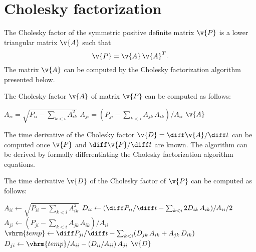 
\section{Cholesky factorization} \label{app:chol}

The Cholesky factor of the symmetric positive definite matrix $\v{P}$ is
a lower triangular matrix $\v{A}$ such that
%
\begin{equation}
  \v{P} = \v{A} \, \v{A}^T.
\end{equation}
%
The matrix $\v{A}$ can be computed by the Cholesky factorization
algorithm \citep[see, e.g., ][]{Golub+vanLoan:1996} presented below.

The Cholesky factor
  $\v{A}$ of matrix $\v{P}$ can be computed as follows:
\begin{algorithmic}[1]
     \State $A_{ii} = \sqrt{P_{ii} - \sum_{k<i} A^2_{ik}}$
        \State $A_{ji} = \left(P_{ji} - \sum_{k<i} A_{jk} \, A_{ik} \right) / A_{ii}$
     \EndFor
  \EndFor
  \State \Return $\v{A}$
\EndProcedure
\end{algorithmic}
%
The time derivative of the Cholesky factor $\v{D} = \diff \v{A} /
\diff t$ can be computed once $\v{P}$ and $\diff \v{P} / \diff t$
are known. The algorithm can be derived by formally differentiating
the Cholesky factorization algorithm equations.

The time
 derivative $\v{D}$ of the Cholesky factor of $\v{P}$ can be
 computed as follows:
\label{alg:dchol}
\begin{algorithmic}[1]
    \State $A_{ii} \gets \sqrt{P_{ii} - \sum_{k<i} A^2_{ik}}$
    \State $D_{ii} \gets (\diff P_{ii} / \diff t -
                     \sum_{k<i} 2 D_{ik} \, A_{ik}) / A_{ii} / 2$
       \State $A_{ji} \gets (P_{ji} - \sum_{k<i} A_{jk} \, A_{ik}) / A_{ii}$
       \State $\vhrm{temp} \gets \diff P_{ji} / \diff t
              - \sum_{k<i} (D_{jk} \, A_{ik} + A_{jk} \, D_{ik})$
       \State $D_{ji} \gets \vhrm{temp} / A_{ii} - (D_{ii} / A_{ii}) \, A_{ji}$
    \EndFor
 \EndFor
 \State \Return $\v{D}$
\EndProcedure
\end{algorithmic}

